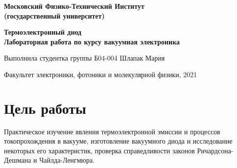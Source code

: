 \documentclass[11pt]{article}
\begin{document}
\begin{titlepage}
\begin{center}
\large\textbf{Московский Физико-Технический Институт}\\
\large\textbf{(государственный университет)}\\
\hfill \break
\hfill \break
\hfill \break
\hfill \break
\hfill \break
\hfill \break
\hfill \break
\hfill \break
\hfill \break
\hfill \break
\hfill \break
\hfill \break
\hfill \break
\hfill \break
\hfill \break
\hfill \break
\hfill \break
\hfill \break

\huge\textbf{ Термоэлектронный диод}\\
\LARGE\textbf{Лабораторная работа по курсу вакуумная электроника}\\
\hfill \break
\hfill \break
\end{center}
\begin{flushright}
\large Выполнила студентка группы Б04-004 Шлапак Мария\\
\end{flushright}
\hfill \break
\hfill \break
\hfill \break
\hfill \break
\hfill \break
\hfill \break
\hfill \break
\hfill \break
\hfill \break
\hfill \break
\hfill \break
\hfill \break
\hfill \break
\hfill \break
\hfill \break
\hfill \break
\begin{center}
\large Факультет электроники, фотоники и молекулярной физики, 2021\\
\end{center}
\end{titlepage}
\tableofcontents
\newpage
\section{Цель работы}
Практическое изучение явления термоэлектронной эмиссии и процессов токопрохождения в вакууме, изготовление вакуумного диода и исследование некоторых его характеристик, проверка справедливости законов Ричардсона-Дешмана и Чайлда-Ленгмюра.\\
\end{document}

